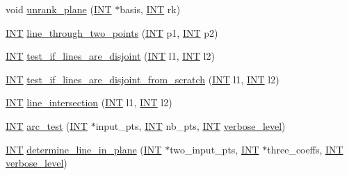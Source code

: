 \begin{DoxyCompactItemize}
\item 
void \mbox{\hyperlink{classprojective__space_ad88f7ed5193abc598e2436b4bca8c7e3}{unrank\+\_\+plane}} (\mbox{\hyperlink{galois_8h_a09fddde158a3a20bd2dcadb609de11dc}{I\+NT}} $\ast$basis, \mbox{\hyperlink{galois_8h_a09fddde158a3a20bd2dcadb609de11dc}{I\+NT}} rk)
\item 
\mbox{\hyperlink{galois_8h_a09fddde158a3a20bd2dcadb609de11dc}{I\+NT}} \mbox{\hyperlink{classprojective__space_abbf3151422696b42f4c4b0b4090495d6}{line\+\_\+through\+\_\+two\+\_\+points}} (\mbox{\hyperlink{galois_8h_a09fddde158a3a20bd2dcadb609de11dc}{I\+NT}} p1, \mbox{\hyperlink{galois_8h_a09fddde158a3a20bd2dcadb609de11dc}{I\+NT}} p2)
\item 
\mbox{\hyperlink{galois_8h_a09fddde158a3a20bd2dcadb609de11dc}{I\+NT}} \mbox{\hyperlink{classprojective__space_a159c852080d3cb54bcf5b38b9d687137}{test\+\_\+if\+\_\+lines\+\_\+are\+\_\+disjoint}} (\mbox{\hyperlink{galois_8h_a09fddde158a3a20bd2dcadb609de11dc}{I\+NT}} l1, \mbox{\hyperlink{galois_8h_a09fddde158a3a20bd2dcadb609de11dc}{I\+NT}} l2)
\item 
\mbox{\hyperlink{galois_8h_a09fddde158a3a20bd2dcadb609de11dc}{I\+NT}} \mbox{\hyperlink{classprojective__space_ae2f9dc4292da2b164992717dfe079632}{test\+\_\+if\+\_\+lines\+\_\+are\+\_\+disjoint\+\_\+from\+\_\+scratch}} (\mbox{\hyperlink{galois_8h_a09fddde158a3a20bd2dcadb609de11dc}{I\+NT}} l1, \mbox{\hyperlink{galois_8h_a09fddde158a3a20bd2dcadb609de11dc}{I\+NT}} l2)
\item 
\mbox{\hyperlink{galois_8h_a09fddde158a3a20bd2dcadb609de11dc}{I\+NT}} \mbox{\hyperlink{classprojective__space_addb4eb5baf4a1396e1b3f490bc5e7b9b}{line\+\_\+intersection}} (\mbox{\hyperlink{galois_8h_a09fddde158a3a20bd2dcadb609de11dc}{I\+NT}} l1, \mbox{\hyperlink{galois_8h_a09fddde158a3a20bd2dcadb609de11dc}{I\+NT}} l2)
\item 
\mbox{\hyperlink{galois_8h_a09fddde158a3a20bd2dcadb609de11dc}{I\+NT}} \mbox{\hyperlink{classprojective__space_a065c2c15235080040332e0b5ea5b5a60}{arc\+\_\+test}} (\mbox{\hyperlink{galois_8h_a09fddde158a3a20bd2dcadb609de11dc}{I\+NT}} $\ast$input\+\_\+pts, \mbox{\hyperlink{galois_8h_a09fddde158a3a20bd2dcadb609de11dc}{I\+NT}} nb\+\_\+pts, \mbox{\hyperlink{galois_8h_a09fddde158a3a20bd2dcadb609de11dc}{I\+NT}} \mbox{\hyperlink{simeon_8_c_a818073fbcc2f439e7c56952f67386122}{verbose\+\_\+level}})
\item 
\mbox{\hyperlink{galois_8h_a09fddde158a3a20bd2dcadb609de11dc}{I\+NT}} \mbox{\hyperlink{classprojective__space_ae7e8e26c331028d5996f7dc4b6a1d7b2}{determine\+\_\+line\+\_\+in\+\_\+plane}} (\mbox{\hyperlink{galois_8h_a09fddde158a3a20bd2dcadb609de11dc}{I\+NT}} $\ast$two\+\_\+input\+\_\+pts, \mbox{\hyperlink{galois_8h_a09fddde158a3a20bd2dcadb609de11dc}{I\+NT}} $\ast$three\+\_\+coeffs, \mbox{\hyperlink{galois_8h_a09fddde158a3a20bd2dcadb609de11dc}{I\+NT}} \mbox{\hyperlink{simeon_8_c_a818073fbcc2f439e7c56952f67386122}{verbose\+\_\+level}})

\end{DoxyCompactItemize}
